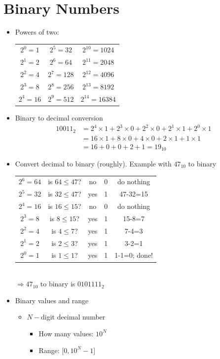 \documentclass[a4paper]{article}
\begin{document}
\section{Binary Numbers}
\begin{itemize}
\item Powers of two:\\
\begin{tabular}{c|c|c}
$2^0= 1$ & $2^5=32$ & $2^{10}= 1024$\\ 
$2^1= 2$ & $2^6=64$ & $2^{11}= 2048$\\ 
$2^2= 4$ & $2^7=128$ & $2^{12}= 4096$\\ 
$2^3= 8$ & $2^8=256$ & $2^{13}= 8192$\\ 
$2^4= 16$ & $2^9=512$ & $2^{14}= 16384$\\ 
\end{tabular}
\item Binary to decimal conversion
\begin{align*}
10011_2&=2^4\times 1 +2^3\times 0 + 2^2\times 0 +2^1\times 1 +2^0\times 1\\
&=16 \times 1+8 \times 0+4 \times 0+2 \times 1+1 \times 1\\
&=16+0+0+2+1=19_{10}
\end{align*}
\item Convert decimal to binary (roughly). Example with $47_{10}$ to binary\\
\begin{tabular}{c|c|c|c|c}
$2^6=64$& is $64\leq 47$?&no&0&do nothing\\ 
$2^5=32$& is $32\leq 47$?&yes&1&47-32=15\\
$2^4=16$& is $16\leq 15$?&no&0&do nothing\\
$2^3=8$& is $8\leq 15$?&yes&1&15-8=7\\ 
$2^2=4$& is $4\leq 7$?&yes&1&7-4=3\\
$2^1=2$& is $2\leq 3$?&yes&1&3-2=1\\
$2^0=1$& is $1\leq 1$?&yes&1&1-1=0; done!\\
\end{tabular}\\
$\Rightarrow 47_{10}$ to binary is $0101111_2$ 
\item Binary values and range
\begin{itemize}
\item $N-$digit decimal number
\begin{itemize}
\item How many values: $10^N$
\item Range: $\lbrack 0,10^{N}-1\rbrack$

\end{itemize}
\end{itemize}
\end{itemize}
\end{document}
